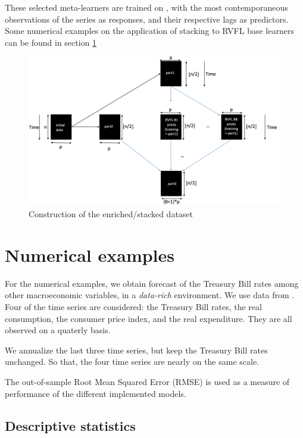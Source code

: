 These selected meta-learners are trained on , with the most contemporaneous observations of the series as responses, and their respective lags as predictors. Some numerical examples on the application of stacking to RVFL base learners can be found in section \ref{sec:numericalexamples}

\begin{figure}[!htb]
\centering
\includegraphics[width=13cm]{gfx/chapter-rvfl-ensembles/rvfl_stacking.png}
\caption{Construction of the enriched/stacked dataset}
\label{rvfl_stacking_plot}
\end{figure}


\section{Numerical examples}
\label{sec:numericalexamples}

For the numerical examples, we obtain forecast of the Treasury Bill rates among other macroeconomic variables, in a \textit{data-rich} environment. We use data from \cite{greene2000econometric}. Four of the time series are considered: the Treasury Bill rates, the real consumption, the consumer price index, and the real expenditure. They are all observed on a quaterly basis. 

We annualize the last three time series, but keep the Treasury Bill rates unchanged. So that, the four time series are nearly on the same scale.

The out-of-sample Root Mean Squared Error (RMSE) is used as a measure of performance of the different implemented models.

\subsection{Descriptive statistics}

